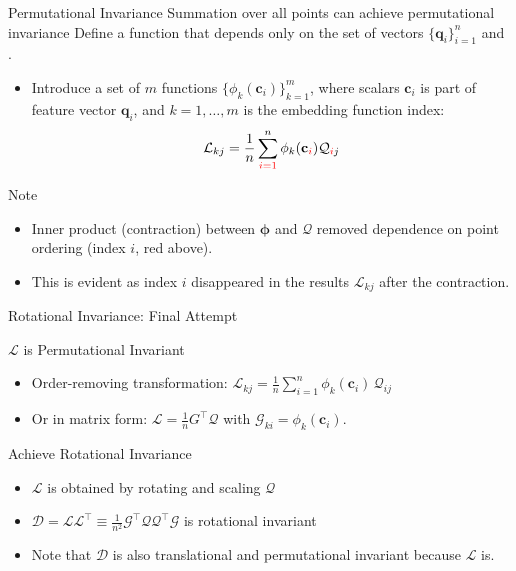 \documentclass[presentation,aspectratio=169]{beamer}
\begin{document}
\begin{frame}[label={sec:org303b9b4}]{Permutational Invariance}
Summation over all points can achieve permutational invariance Define a
function that depends only on the set of vectors
\(\{\mathbf{q}_i\}_{i=1}^n\) and .

\begin{itemize}
\item Introduce a set of \(m\) functions \(\{\phi_k(\mathbf{c}_i)\}_{k=1}^m\),
where scalars \(\mathbf{c}_i\) is part of feature vector
\(\mathbf{q}_i\), and \(k=1, \ldots, m\) is the embedding function index:
\[
   \mathcal{L}_{k j} = \frac1n \sum^{n}_{\color{red} i=1} \phi_k(\mathbf{c}_{\color{red} i}) \mathcal{Q}_{{\color{red} i}j}
   \]
\end{itemize}

Note

\begin{itemize}
\item Inner product (contraction) between \(\bm{\phi}\) and \(\mathcal{Q}\)
removed dependence on point ordering (index \(i\), red above).

\item This is evident as index \(i\) disappeared in the results
\(\mathcal{L}_{k j}\) after the contraction.
\end{itemize}
\end{frame}

\begin{frame}[label={sec:orgc335502}]{Rotational Invariance: Final Attempt}
\begin{block}{\(\mathcal{L}\) is Permutational Invariant}
\begin{itemize}
\item Order-removing transformation:
\(\mathcal{L}_{k j} = \frac{1}{n} \sum_{i=1}^n \phi_k(\mathbf{c}_i) \,  \mathcal{Q}_{ij}\)

\item Or in matrix form: \(\mathcal{L}=\frac{1}{n} G^\top \mathcal{Q}\) with
\(\mathcal{G}_{k i} = \phi_k(\mathbf{c}_i)\).
\end{itemize}
\end{block}

\begin{block}{Achieve Rotational Invariance}
\begin{itemize}
\item \(\mathcal{L}\) is obtained by rotating and scaling \(\mathcal{Q}\)

\item \(\mathcal{D} = \mathcal{L} \mathcal{L}^{\top} \equiv \frac{1}{n^2}\mathcal{G}^\top \mathcal{Q} \mathcal{Q}^\top \mathcal{G}\)
is rotational invariant

\item Note that \(\mathcal{D}\) is also translational and permutational
invariant because \(\mathcal{L}\) is.
\end{itemize}
\end{block}
\end{frame}
\end{document}
